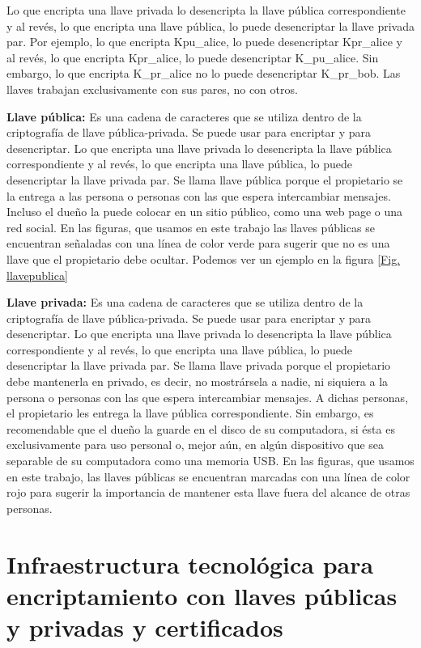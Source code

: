 \documentclass[12pt]{report} %
\begin{document}
Lo que encripta una llave privada lo desencripta la llave pública correspondiente y al revés, lo que encripta una llave pública, lo puede desencriptar la llave privada par. Por ejemplo, lo que encripta Kpu\_alice, lo puede desencriptar Kpr\_alice y al revés, lo que encripta Kpr\_alice, lo puede desencriptar K\_pu\_alice.  Sin embargo, lo que encripta K\_pr\_alice no lo puede desencriptar K\_pr\_bob. Las llaves trabajan exclusivamente con sus pares, no con otros.

\textbf{Llave pública:} Es una cadena de caracteres que se utiliza dentro de la criptografía de llave pública-privada. Se puede usar para encriptar y para desencriptar.  Lo que encripta una llave privada lo desencripta la llave pública correspondiente y al revés, lo que encripta una llave pública, lo puede desencriptar la llave privada par.  Se llama llave pública porque el propietario se la entrega a las persona o personas con las que espera intercambiar mensajes. Incluso el dueño la puede colocar en un sitio público, como una web page o una red social. En las figuras, que usamos en este trabajo las llaves públicas se encuentran señaladas con una línea de color verde para sugerir que no es una llave que el propietario debe ocultar. Podemos ver un ejemplo en la figura \ref{Fig. llavepublica}



\textbf{Llave privada:} Es una cadena de caracteres que se utiliza dentro de la criptografía de llave pública-privada. Se puede usar para encriptar y para desencriptar. Lo que encripta una llave privada lo desencripta la llave pública correspondiente y al revés, lo que encripta una llave pública, lo puede desencriptar la llave privada par. Se llama llave privada porque el propietario debe mantenerla en privado, es decir, no mostrársela a nadie, ni siquiera a la persona o personas con las que espera intercambiar mensajes. A dichas personas, el propietario les entrega la llave pública correspondiente. Sin embargo, es recomendable que el dueño la guarde en el disco de su computadora, si ésta es exclusivamente para uso personal o, mejor aún, en algún dispositivo que sea separable de su computadora como una memoria USB. En las figuras, que usamos en este trabajo, las llaves públicas se encuentran marcadas con una línea de color rojo para sugerir la importancia de mantener esta llave fuera del alcance de otras personas.

\section{Infraestructura tecnológica para encriptamiento con llaves públicas y privadas y certificados}
\end{document}
